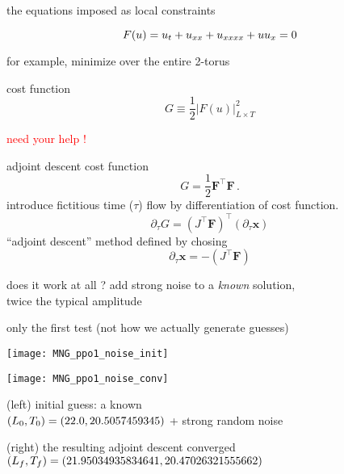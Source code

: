 \begin{frame}{the equations imposed as local constraints}
\begin{block}{\KSe}
\[
F(u) = u_t + u_{x x} + u_{x x x x} + u u_{x} = 0
\]
\end{block}
\bigskip\bigskip
for example, minimize over the entire 2-torus
\begin{block}{cost function}
\[
G \equiv \frac{1}{2} |F(u)|^2_{L \times T}
\]
\end{block}
\vfill\hfill\textcolor{red}{\Huge need your help !}
\end{frame}

\begin{frame}{adjoint descent}
cost function
\[
  G = \frac{1}{2} \mathbf{F}^{\top}\mathbf{F}
  \,.
\]
introduce fictitious time ($\tau$) flow by differentiation of cost function.
\[
  \partial_{\tau}G = (J^{\top}\mathbf{F})^{\top}(\partial_{\tau}\mathbf{x})
\]
  ``adjoint descent'' method defined by chosing
\[
  \partial_{\tau}\mathbf{x} = -(J^{\top}\mathbf{F})
\]

\end{frame}

\begin{frame}{does it work at all ?}
add strong noise to a \emph{known} solution, \\ twice the typical amplitude
\begin{block}{only the first test}
{\scriptsize (not how we actually generate guesses)} \\
\begin{minipage}[height=.32\textheight]{.35\textwidth}
\centering %
\texttt{[image: MNG\_ppo1\_noise\_init]}
\end{minipage}
    \qquad
\begin{minipage}[height=.32\textheight]{.35\textwidth}
\centering %
\texttt{[image: MNG\_ppo1\_noise\_conv]}
\end{minipage}
\end{block}

{\scriptsize (left) initial guess: a known %
\twot} \\
$({L_{0}},{T_{0}})=(22.0,20.5057459345)$
+
strong random noise
\medskip

{\scriptsize (right) the resulting adjoint descent converged \twot} \\
$({L_{f}},{T_{f}})=(21.95034935834641,20.47026321555662)$
\end{frame}

